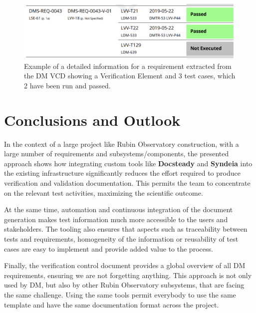 \begin{figure}
\begin{center}
\includegraphics[width=\textwidth]{imgs/VCDdetail.png}
 \caption{Example of a detailed information for a requirement extracted from the DM VCD 
 showing a Verification Element and 3 test cases, which 2 have been run and passed.}
 \label{fig:vcddetail}
\end{center}
\end{figure}


\section{Conclusions and Outlook}

In the context of a large project like Rubin Observatory construction, with a large number of requirements
and subsystems/components, the presented approach shows how integrating custom tools like \textbf{Docsteady}
and \textbf{Syndeia} into the existing infrastructure significantly reduces the effort
required to produce verification and validation documentation.
This permits the team to concentrate on the relevant test activities, maximizing the scientific outcome.

At the same time, automation and continuous integration of the document generation makes test information
much more accessible to the users and stakeholders.
The tooling also ensures that aspects such as traceability between tests and requirements, homogeneity of the information
or reusability of test cases are easy to implement and provide added value to the process.

Finally, the verification control document provides a global overview of all DM requirements, ensuring we are not forgetting anything.
This approach is not only used by DM, but also by other Rubin Observatory subsystems, that are facing the same challenge.
Using the same tools permit everybody to use the same template and have the same documentation format across the project.


